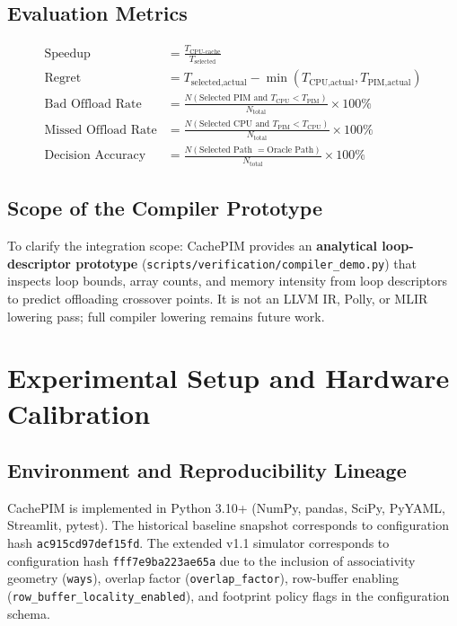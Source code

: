 \documentclass[journal,10pt,twocolumn]{IEEEtran}
\begin{document}
\subsection{Evaluation Metrics}
\begin{align}
\text{Speedup} &= \frac{T_{\text{CPU-cache}}}{T_{\text{selected}}} \\
\text{Regret} &= T_{\text{selected,actual}} - \min\left(T_{\text{CPU,actual}}, T_{\text{PIM,actual}}\right) \\
\text{Bad Offload Rate} &= \frac{N(\text{Selected PIM and } T_{\text{CPU}} < T_{\text{PIM}})}{N_{\text{total}}} \times 100\% \\
\text{Missed Offload Rate} &= \frac{N(\text{Selected CPU and } T_{\text{PIM}} < T_{\text{CPU}})}{N_{\text{total}}} \times 100\% \\
\text{Decision Accuracy} &= \frac{N(\text{Selected Path } = \text{Oracle Path})}{N_{\text{total}}} \times 100\%
\end{align}

\subsection{Scope of the Compiler Prototype}
To clarify the integration scope: CachePIM provides an \textbf{analytical loop-descriptor prototype} (\texttt{scripts/verification/compiler\_demo.py}) that inspects loop bounds, array counts, and memory intensity from loop descriptors to predict offloading crossover points. It is not an LLVM IR, Polly, or MLIR lowering pass; full compiler lowering remains future work.

\section{Experimental Setup and Hardware Calibration}
\subsection{Environment and Reproducibility Lineage}
CachePIM is implemented in Python 3.10+ (NumPy, pandas, SciPy, PyYAML, Streamlit, pytest). The historical baseline snapshot corresponds to configuration hash \texttt{ac915cd97def15fd}. The extended v1.1 simulator corresponds to configuration hash \texttt{fff7e9ba223ae65a} due to the inclusion of associativity geometry (\texttt{ways}), overlap factor (\texttt{overlap\_factor}), row-buffer enabling (\texttt{row\_buffer\_locality\_enabled}), and footprint policy flags in the configuration schema.
\end{document}
